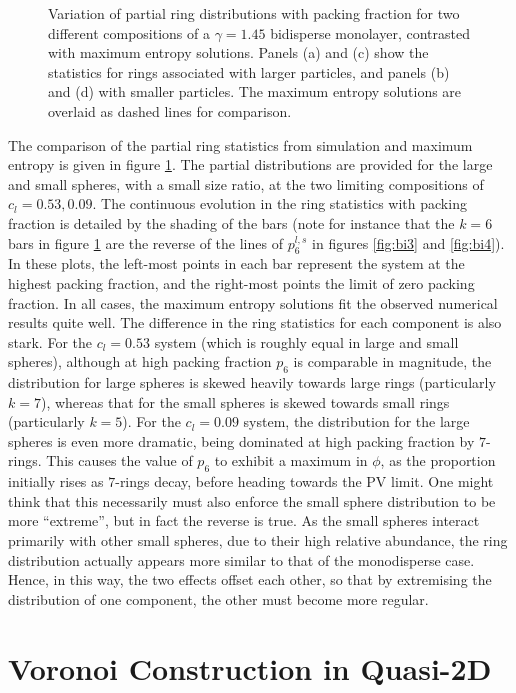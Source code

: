 \begin{figure}[bt]
     \caption{Variation of partial ring distributions with packing fraction for two different compositions of a $\gamma=1.45$ bidisperse monolayer, contrasted with maximum entropy solutions. Panels (a) and (c) show the statistics for rings associated with larger particles, and panels (b) and (d) with smaller particles. The maximum entropy solutions are overlaid as dashed lines for comparison.}
     \label{fig:bime}
\end{figure}

The comparison of the partial ring statistics from simulation and maximum entropy is given in figure \ref{fig:bime}.
The partial distributions are provided for the large and small spheres, with a small size ratio, at the two limiting compositions of $c_l=0.53,0.09$.
The continuous evolution in the ring statistics with packing fraction is detailed by the shading of the bars (note for instance that the $k=6$ bars in figure \ref{fig:bime} are the reverse of the lines of $p_6^{l,s}$ in figures \ref{fig:bi3} and \ref{fig:bi4}).
In these plots, the left\--most points in each bar represent the system at the highest packing fraction, and the right\--most points the limit of zero packing fraction.
In all cases, the maximum entropy solutions fit the observed numerical results quite well.
The difference in the ring statistics for each component is also stark.
For the $c_l=0.53$ system (which is roughly equal in large and small spheres), although at high packing fraction $p_6$ is comparable in magnitude, the distribution for large spheres is skewed heavily towards large rings (particularly $k=7$), whereas that for the small spheres is skewed towards small rings (particularly $k=5$).
For the $c_l=0.09$ system, the distribution for the large spheres is even more dramatic, being dominated at high packing fraction by $7$\--rings.
This causes the value of $p_6$ to exhibit a maximum in $\phi$, as the proportion initially rises as $7$\--rings decay, before heading towards the PV limit.
One might think that this necessarily must also enforce the small sphere distribution to be more ``extreme'', but in fact the reverse is true.
As the small spheres interact primarily with other small spheres, due to their high relative abundance, the ring distribution actually appears more similar to that of the monodisperse case.
Hence, in this way, the two effects offset each other, so that by extremising the distribution of one component, the other must become more regular.


\section{Voronoi Construction in Quasi\--2D}

